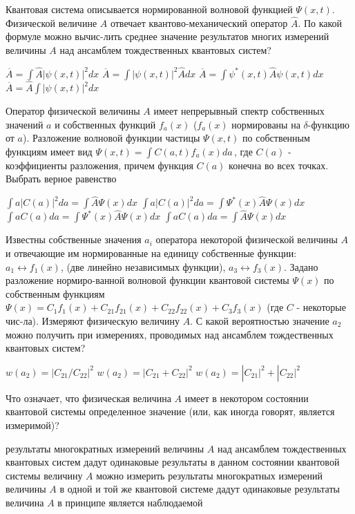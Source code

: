 \documentclass[11pt,a4paper]{exam}
\begin{document}
\begin{questions}
\question Квантовая система описывается нормированной волновой функцией $\Psi (x,t)$. Физической величине $A$ отвечает квантово-механический оператор $\hat A$. По какой формуле можно вычис-лить среднее значение результатов многих измерений величины $A$ над ансамблем тождественных квантовых систем?
\begin{choices}
\choice $\overline A  = \int {\hat A|} \psi (x,t){|^2}dx$      
\choice $\overline A  = \int | \psi (x,t){|^2}\hat Adx$  
\choice $\overline A  = \int {{\psi ^*}(x,t)\hat A} \psi (x,t)dx$    
\choice $\overline A  = \hat A\int {|\psi (x,t){|^2}} dx$
\end{choices}

\question Оператор физической величины $A$ имеет непрерывный спектр собственных значений $a$ и собственных функций ${f_a}(x)$ (${f_a}(x)$ нормированы на $\delta $-функцию от $a$). Разложение волновой функции частицы $\Psi (x,t)$ по собственным функциям имеет вид $\Psi (x,t) = \int {C(a,t){f_a}(x)da} \,$, где $C(a)$ - коэффициенты разложения, причем функция $C(a)$ конечна во всех точках. Выбрать верное равенство
\begin{choices}
\choice $\int {a|C(a){|^2}da}  = \int {\hat A} \Psi (x)dx$        
\choice $\int {a|C(a){|^2}da}  = \int {{\Psi ^*}(x)\hat A} \Psi (x)dx$
\choice $\int {aC(a)da}  = \int {{\Psi ^*}(x)\hat A} \Psi (x)dx$        
\choice $\int {aC(a)da}  = \int {\hat A} \Psi (x)dx$
\end{choices}

\question Известны собственные значения ${a_i}$ оператора некоторой физической величины $A$ и отвечающие им нормированные на единицу собственные функции: ${a_1} \leftrightarrow {f_1}(x)$,  (две линейно независимых функции), ${a_3} \leftrightarrow {f_3}(x)$. Задано разложение нормиро-ванной волновой функции квантовой системы $\Psi (x)$ по собственным функциям $\Psi (x) = {C_1}{f_1}(x) + {C_{21}}{f_{21}}(x) + {C_{22}}{f_{22}}(x) + {C_3}{f_3}(x)$ (где $C$ - некоторые чис-ла). Измеряют физическую величину $A$. С какой вероятностью значение ${a_2}$ можно получить при измерениях, проводимых над ансамблем тождественных квантовых систем?
\begin{choices}
\choice        
\choice $w({a_2}) = |{C_{21}}/{C_{22}}{|^2}$
\choice $w({a_2}) = |{C_{21}} + {C_{22}}{|^2}$     
\choice $w({a_2}) = |{C_{21}}{|^2} + |{C_{22}}{|^2}$
\end{choices}

\question Что означает, что физическая величина $A$ имеет в некотором состоянии квантовой системы определенное значение (или, как иногда говорят, является измеримой)?
\begin{choices}
\choice результаты многократных измерений величины $A$ над ансамблем тождественных квантовых систем дадут одинаковые результаты
\choice в данном состоянии квантовой системы величину $A$ можно измерить
\choice результаты многократных измерений величины $A$ в одной и той же квантовой системе дадут одинаковые результаты
\choice величина $A$ в принципе является наблюдаемой
\end{choices}


\end{questions}
\end{document}
